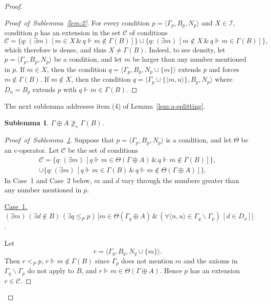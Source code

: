 \documentclass[10pt,a4paper]{amsart}
\newtheorem{sublemma}{Sublemma}
\newcommand{\QA}[1]{(\forall{#1})\,}
\newcommand{\QE}[1]{(\exists{#1})\,}
\begin{document}
\begin{proof}
\begin{proof}[Proof~of~Sublemma~\ref{lem:2}] 
For every condition $p=\langle \Gamma_p, B_p, N_p\rangle$ and $X \in 
\mathcal{I}$, condition $p$ has an extension in the set $\mathcal{C}$ of 
conditions 
\[
\mathcal{C}=\{q: \QE{m} \left[m \in X \,\&\, 
q \Vdash m \notin \Gamma(B)\right]\}
\cup \{q: \QE{m} \left[m \notin X \,\&\, q \Vdash m \in \Gamma(B)\right]\},
\]
which therefore is dense, and thus $X \ne \Gamma(B)$. Indeed, to see density, 
let $p=\langle \Gamma_p, B_p, N_p\rangle$ be a condition, and let $m$ be 
larger than any number mentioned in $p$. If $m\in X$, then the condition 
$q=\langle \Gamma_p, B_p, N_p \cup \{m\} \rangle$ extends $p$ and forces $m 
\notin \Gamma(B)$. If $m\notin X$, then the condition $q=\langle \Gamma_p\cup 
\{\langle m, u\rangle\}, B_p, N_p  \rangle$ where $D_u = B_p$ extends $p$ with $q \Vdash m \in 
\Gamma(B)$. 
\end{proof}

The next sublemma addresses item (4) of Lemma~\ref{lem:a-splitting}. 

\begin{sublemma}\label{lem:3}
$\Gamma\oplus A \ngeq_e \Gamma(B)$.
\end{sublemma}

\begin{proof}[Proof~of~Sublemma~\ref{lem:3}] 
Suppose that $p=\langle \Gamma_p, B_p, N_p\rangle$ is a condition, and let 
$\Theta$ be an $e$-operator. Let $\mathcal{C}$ be the set of conditions 
\begin{multline*}
\mathcal{C}=\{q: \QE{m} \left[ q \Vdash m \in \Theta(\Gamma \oplus A) \,\&\,
q \Vdash m \notin \Gamma(B)\right]\},\\
\cup \{q: \QE{m} \left[q \Vdash m \in \Gamma(B) \,\&\, q \Vdash m \notin 
\Theta(\Gamma \oplus A) \right]\}.
\end{multline*}
In Case~1 and Case~2 below, $m$ and $d$ vary through the numbers greater than 
any number mentioned in $p$. 

\underline{Case~1.} $\QE{m}\QE{d \notin B}\QE{q \leq_P p}
\bigl[m \in \Theta(\Gamma_q\oplus A) \,\&\, \QA{\langle n, u 
\rangle \in \Gamma_q \smallsetminus \Gamma_p}[d \in D_u]\bigr]$.

Let
\[
r=\langle \Gamma_q, B_q,  N_q \cup\{m\}\rangle.
\]
Then $r <_P p$, $r\Vdash   m \notin \Gamma(B)$ since $\Gamma_p$ does not 
mention $m$ and the axioms in $\Gamma_q \smallsetminus \Gamma_p$ do not apply 
to $B$, and $ r \Vdash m \in \Theta(\Gamma \oplus A)$. Hence $p$ has an 
extension $r \in \mathcal{C}$. 


\end{proof}
\end{proof}
\end{document}

